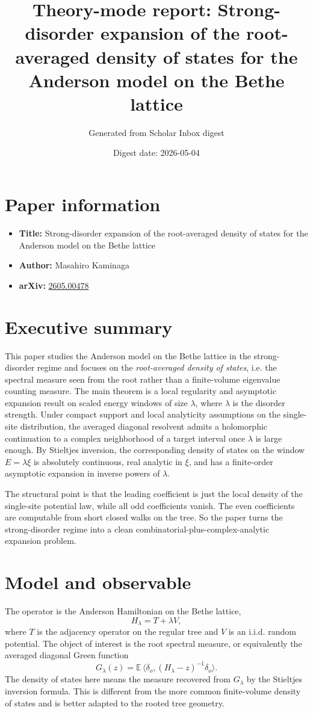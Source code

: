 \documentclass[11pt]{article}
\title{\textbf{Theory-mode report: Strong-disorder expansion of the root-averaged density of states for the Anderson model on the Bethe lattice}}
\author{Generated from Scholar Inbox digest}
\date{Digest date: 2026-05-04}
\begin{document}
\maketitle
\section*{Paper information}
\begin{itemize}[leftmargin=1.5em]
\item \textbf{Title:} Strong-disorder expansion of the root-averaged density of states for the Anderson model on the Bethe lattice
\item \textbf{Author:} Masahiro Kaminaga
\item \textbf{arXiv:} \href{https://arxiv.org/abs/2605.00478}{2605.00478}
\end{itemize}
\section*{Executive summary}
This paper studies the Anderson model on the Bethe lattice in the strong-disorder regime and focuses on the \emph{root-averaged density of states}, i.e. the spectral measure seen from the root rather than a finite-volume eigenvalue counting measure. The main theorem is a local regularity and asymptotic expansion result on scaled energy windows of size $\lambda$, where $\lambda$ is the disorder strength. Under compact support and local analyticity assumptions on the single-site distribution, the averaged diagonal resolvent admits a holomorphic continuation to a complex neighborhood of a target interval once $\lambda$ is large enough. By Stieltjes inversion, the corresponding density of states on the window $E=\lambda\xi$ is absolutely continuous, real analytic in $\xi$, and has a finite-order asymptotic expansion in inverse powers of $\lambda$.

The structural point is that the leading coefficient is just the local density of the single-site potential law, while all odd coefficients vanish. The even coefficients are computable from short closed walks on the tree. So the paper turns the strong-disorder regime into a clean combinatorial-plus-complex-analytic expansion problem.
\section*{Model and observable}
The operator is the Anderson Hamiltonian on the Bethe lattice,
\[
H_\lambda = T + \lambda V,
\]
where $T$ is the adjacency operator on the regular tree and $V$ is an i.i.d. random potential. The object of interest is the root spectral measure, or equivalently the averaged diagonal Green function
\[
G_\lambda(z)=\mathbb E\,\langle \delta_o,(H_\lambda-z)^{-1}\delta_o\rangle.
\]
The density of states here means the measure recovered from $G_\lambda$ by the Stieltjes inversion formula. This is different from the more common finite-volume density of states and is better adapted to the rooted tree geometry.
\end{document}
